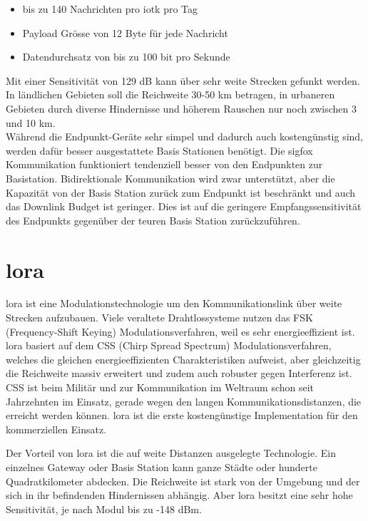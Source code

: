 \begin{itemize}
  \item bis zu 140 Nachrichten pro \gls{iotk} pro Tag
  \item Payload Grösse von 12 Byte für jede Nachricht
  \item Datendurchsatz von bis zu 100 bit pro Sekunde
\end{itemize}

Mit einer Sensitivität von 129 dB kann über sehr weite Strecken gefunkt werden. In ländlichen Gebieten soll die Reichweite 30-50 km betragen, in urbaneren Gebieten durch diverse Hindernisse und höherem Rauschen nur noch zwischen 3 und 10 km. \\
Während die Endpunkt-Geräte sehr simpel und dadurch auch kostengünstig sind, werden dafür besser ausgestattete Basis Stationen benötigt. Die \gls{sigfox} Kommunikation funktioniert tendenziell besser von den Endpunkten zur Basistation. Bidirektionale Kommunikation wird zwar unterstützt, aber die Kapazität von der Basis Station zurück zum Endpunkt ist beschränkt und auch das Downlink Budget ist geringer. Dies ist auf die geringere Empfangssensitivität des Endpunkts gegenüber der teuren Basis Station zurückzuführen.

\section{\gls{lora}}

\gls{lora} ist eine Modulationstechnologie um den Kommunikationslink über weite Strecken aufzubauen. Viele veraltete Drahtlossysteme nutzen das FSK (Frequency-Shift Keying) Modulationsverfahren, weil es sehr energieeffizient ist. \gls{lora} basiert auf dem CSS (Chirp Spread Spectrum) Modulationsverfahren, welches die gleichen energieeffizienten Charakteristiken aufweist, aber gleichzeitig die Reichweite massiv erweitert und zudem auch robuster gegen Interferenz ist. CSS ist beim Militär und zur Kommunikation im Weltraum schon seit Jahrzehnten im Einsatz, gerade wegen den langen Kommunikationsdistanzen, die erreicht werden können. \gls{lora} ist die erste kostengünstige Implementation für den kommerziellen Einsatz.    

Der Vorteil von \gls{lora} ist die auf weite Distanzen ausgelegte Technologie. Ein einzelnes Gateway oder Basis Station kann ganze Städte oder hunderte Quadratkilometer abdecken. Die Reichweite ist stark von der Umgebung und der sich in ihr befindenden Hindernissen abhängig. Aber \gls{lora} besitzt eine sehr hohe Sensitivität, je nach Modul bis zu -148 dBm. 

